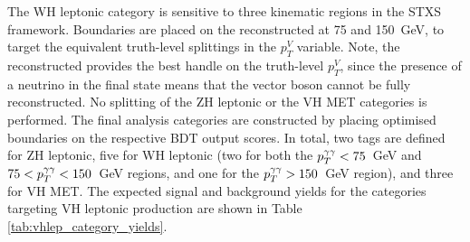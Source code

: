 The WH leptonic category is sensitive to three kinematic regions in the STXS framework. Boundaries are placed on the reconstructed \ptgg at 75 and 150~GeV, to target the equivalent truth-level splittings in the $p_T^V$ variable. Note, the reconstructed \ptgg provides the best handle on the truth-level $p_T^V$, since the presence of a neutrino in the final state means that the vector boson cannot be fully reconstructed. No splitting of the ZH leptonic or the VH MET categories is performed. The final analysis categories are constructed by placing optimised boundaries on the respective BDT output scores. In total, two tags are defined for ZH leptonic, five for WH leptonic (two for both the $p_T^{\gamma\gamma}<75$~GeV and $75<p_T^{\gamma\gamma}<150$~GeV regions, and one for the $p_T^{\gamma\gamma}>150$~GeV region), and three for VH MET. The expected signal and background yields for the categories targeting VH leptonic production are shown in Table \ref{tab:vhlep_category_yields}.

